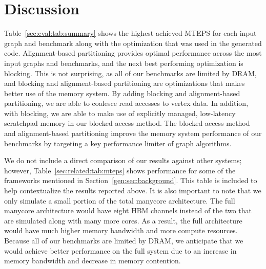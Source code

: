 \section{Discussion}\label{sec:discussion}


\overviewResultsTable


Table~\ref{sec:eval:tab:summary} shows the highest achieved MTEPS for each input graph and benchmark along with the optimization that was used in the generated code.
Alignment-based partitioning provides optimal performance across the most input graphs and benchmarks, and the next best performing optimization is blocking.
This is not surprising, as all of our benchmarks are limited by DRAM, and blocking and alignment-based partitioning are optimizations that makes better use of the memory system.
By adding blocking and alignment-based partitioning, we are able to coalesce read accesses to vertex data.
In addition, with blocking, we are able to make use of explicitly managed, low-latency scratchpad memory in our blocked access method. 
The blocked access method and alignment-based partitioning improve the memory system performance of our benchmarks by targeting a key performance limiter of graph algorithms.

We do not include a direct comparison of our results against other systems; however, Table~\ref{sec:related:tab:mteps} shows performance for some of the frameworks mentioned in Section~\ref{gen:sec:background}. This table is included to help contextualize the results reported above.
It is also important to note that we only simulate a small portion of the total manycore architecture. 
The full manycore architecture would have eight HBM channels instead of the two that are simulated along with many more cores.
As a result, the full architecture would have much higher memory bandwidth and more compute resources. 
Because all of our benchmarks are limited by DRAM, we anticipate that we would achieve better performance on the full system due to an increase in memory bandwidth and decrease in memory contention.

\relatedMTEPSTable